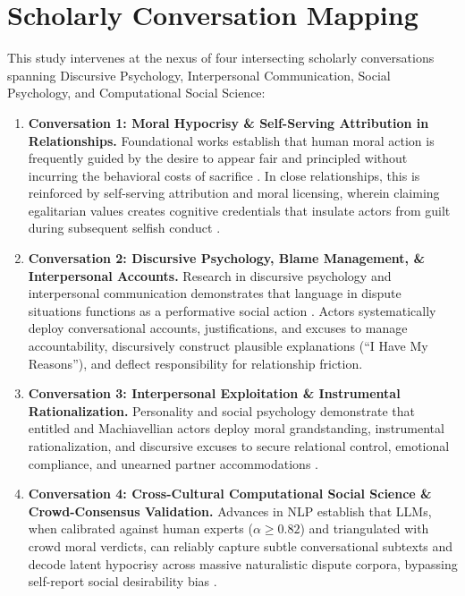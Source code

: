 \documentclass[11pt,a4paper]{article}
\begin{document}
\section{Scholarly Conversation Mapping}
This study intervenes at the nexus of four intersecting scholarly conversations spanning Discursive Psychology, Interpersonal Communication, Social Psychology, and Computational Social Science:
\begin{enumerate}
    \item \textbf{Conversation 1: Moral Hypocrisy \& Self-Serving Attribution in Relationships.} Foundational works establish that human moral action is frequently guided by the desire to appear fair and principled without incurring the behavioral costs of sacrifice \citep{batson1997unmasking,batson1999moral}. In close relationships, this is reinforced by self-serving attribution and moral licensing, wherein claiming egalitarian values creates cognitive credentials that insulate actors from guilt during subsequent selfish conduct \citep{monin2001moral,merritt2010moral,krettenauer2022when}.
    \item \textbf{Conversation 2: Discursive Psychology, Blame Management, \& Interpersonal Accounts.} Research in discursive psychology and interpersonal communication demonstrates that language in dispute situations functions as a performative social action \citep{edwards1992discursive,billig1996arguing}. Actors systematically deploy conversational accounts, justifications, and excuses \citep{scott1968accounts} to manage accountability, discursively construct plausible explanations (``I Have My Reasons''), and deflect responsibility for relationship friction.
    \item \textbf{Conversation 3: Interpersonal Exploitation \& Instrumental Rationalization.} Personality and social psychology demonstrate that entitled and Machiavellian actors deploy moral grandstanding, instrumental rationalization, and discursive excuses to secure relational control, emotional compliance, and unearned partner accommodations \citep{bandura1999moral,savejnarong2022interpersonal,cerulli2026dark}.
    \item \textbf{Conversation 4: Cross-Cultural Computational Social Science \& Crowd-Consensus Validation.} Advances in NLP establish that LLMs, when calibrated against human experts ($\alpha \ge 0.82$) and triangulated with crowd moral verdicts, can reliably capture subtle conversational subtexts and decode latent hypocrisy across massive naturalistic dispute corpora, bypassing self-report social desirability bias \citep{ziems2024large,argyle2023out,grossmann2024generative}.
\end{enumerate}
\end{document}
